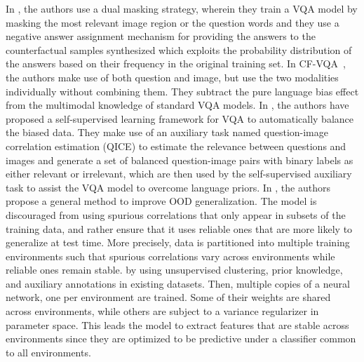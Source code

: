 \documentclass[10pt,twocolumn,letterpaper]{article}
\begin{document}
In \cite{debiasing:2022}, the authors use a dual masking strategy, wherein they train a VQA model by masking the most relevant image region or the question words and they use a negative answer assignment mechanism for providing the answers to the counterfactual samples synthesized which exploits the probability distribution of the answers based on their frequency in the original training set. In CF-VQA~\cite{counterfactual_vqa:2021}, the authors make use of both question and image, but use the two modalities individually without combining them. They subtract the pure language bias effect from the multimodal knowledge of standard VQA models. In \cite{overcoming_bias:2020}, the authors have proposed a self-supervised learning framework for VQA to automatically balance the biased data. They make use of an auxiliary task named question-image correlation estimation (QICE) to estimate the relevance between questions and images and generate a set of balanced question-image pairs with binary labels as either relevant or irrelevant, which are then used by the self-supervised auxiliary task to assist the VQA model to overcome language priors. In \cite{unshuffle_bias:2021}, the authors propose a general method to improve OOD generalization. The model is discouraged from using spurious correlations that only appear in subsets of the training data, and rather ensure that it uses reliable ones that are more likely to generalize at test time. More precisely, data is partitioned into multiple training environments such that spurious correlations vary across environments while reliable ones remain stable. by using unsupervised clustering, prior knowledge, and auxiliary annotations in existing datasets. Then, multiple copies of a neural network, one per environment are trained. Some of their weights are shared across environments, while others are subject to a variance regularizer in parameter space. This leads the model to extract features that are stable across environments since they are optimized to be predictive under a classifier common to all environments.
\end{document}
